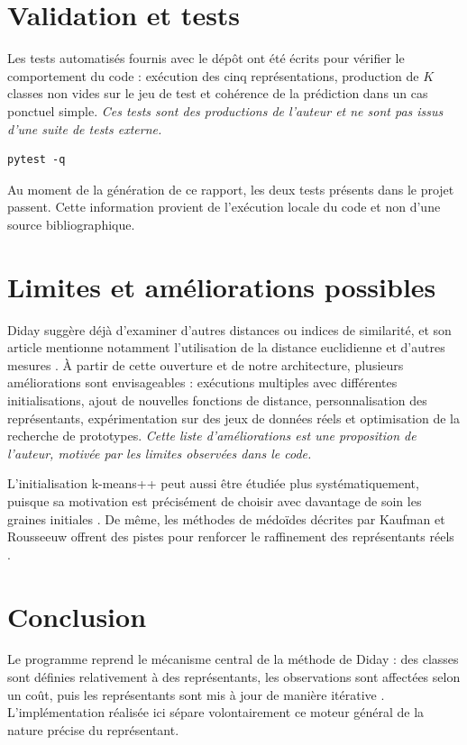 \documentclass[12pt,a4paper]{article}
\begin{document}
\section{Validation et tests}

Les tests automatisés fournis avec le dépôt ont été écrits pour vérifier le comportement du code : exécution des cinq représentations, production de $K$ classes non vides sur le jeu de test et cohérence de la prédiction dans un cas ponctuel simple. \textit{Ces tests sont des productions de l'auteur et ne sont pas issus d'une suite de tests externe.}

\begin{lstlisting}
pytest -q
\end{lstlisting}

Au moment de la génération de ce rapport, les deux tests présents dans le projet passent. Cette information provient de l'exécution locale du code et non d'une source bibliographique.

\section{Limites et améliorations possibles}

Diday suggère déjà d'examiner d'autres distances ou indices de similarité, et son article mentionne notamment l'utilisation de la distance euclidienne et d'autres mesures \cite[p.~24]{diday1971}. À partir de cette ouverture et de notre architecture, plusieurs améliorations sont envisageables : exécutions multiples avec différentes initialisations, ajout de nouvelles fonctions de distance, personnalisation des représentants, expérimentation sur des jeux de données réels et optimisation de la recherche de prototypes. \textit{Cette liste d'améliorations est une proposition de l'auteur, motivée par les limites observées dans le code.}

L'initialisation k-means++ peut aussi être étudiée plus systématiquement, puisque sa motivation est précisément de choisir avec davantage de soin les graines initiales \cite{arthur2007}. De même, les méthodes de médoïdes décrites par Kaufman et Rousseeuw offrent des pistes pour renforcer le raffinement des représentants réels \cite{kaufman1990}.

\section{Conclusion}

Le programme reprend le mécanisme central de la méthode de Diday : des classes sont définies relativement à des représentants, les observations sont affectées selon un coût, puis les représentants sont mis à jour de manière itérative \cite[pp.~20--23]{diday1971}. L'implémentation réalisée ici sépare volontairement ce moteur général de la nature précise du représentant.
\end{document}
